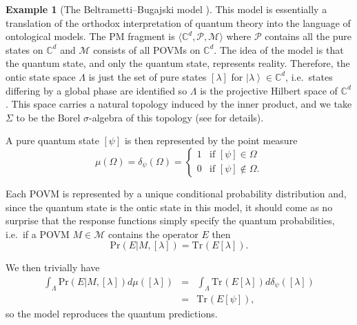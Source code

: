\documentclass[DIV=calc,paper=a4,fontsize=11pt,twocolumn]{scrartcl} %
\theoremstyle{definition}
\newtheorem{example}[definition]{Example}
\theoremstyle{plain}
\newcommand{\Ket}[1]{\ensuremath{\left \vert #1 \right \rangle}}
\newcommand{\Proj}[1]{\ensuremath{\left [ #1 \right ]}}
\newcommand{\Tr}[2][]{\ensuremath{\text{Tr}_{#1} \left ( #2 \right )}}
\begin{document}
\begin{example}[The Beltrametti--Bugajski model \cite{Beltrametti1995}]
This model is essentially a translation of the orthodox
interpretation of quantum theory into the language of ontological
models.  The PM fragment is $\langle \mathbb{C}^d, \mathcal{P},
\mathcal{M}\rangle$ where $\mathcal{P}$ contains all the pure states
on $\mathbb{C}^d$ and $\mathcal{M}$ consists of all POVMs on
$\mathbb{C}^d$.  The idea of the model is that the quantum state,
and only the quantum state, represents reality.  Therefore, the
ontic state space $\Lambda$ is just the set of pure states
$\Proj{\lambda}$ for $\Ket{\lambda} \in \mathbb{C}^d$, i.e.\ states
differing by a global phase are identified so $\Lambda$ is the
projective Hilbert space of $\mathbb{C}^d$.  This space carries a
natural topology induced by the inner product, and we take $\Sigma$
to be the Borel $\sigma$-algebra of this topology (see
\cite{Stulpe2007} for details).

A pure quantum state $\Proj{\psi}$ is then represented by the point
measure
\begin{equation}
\mu(\Omega) = \delta_{\psi}(\Omega) = \begin{cases} 1 &
\text{if}\,\, \Proj{\psi} \in \Omega \\
0 & \text{if}\,\, \Proj{\psi} \notin \Omega. \end{cases}
\end{equation}

Each POVM is represented by a unique conditional probability
distribution and, since the quantum state is the ontic state in this
model, it should come as no surprise that the response functions
simply specify the quantum probabilities, i.e.\ if a POVM $M \in
\mathcal{M}$ contains the operator $E$ then
\begin{equation}
\text{Pr}(E|M,\Proj{\lambda}) = \Tr{E \Proj{\lambda}}.
\end{equation}

We then trivially have
\begin{eqnarray}
\int_{\Lambda} \text{Pr}(E|M,\Proj{\lambda}) d\mu(\Proj{\lambda})  &=&
\int_{\Lambda} \Tr{E \Proj{\lambda}} d
\delta_{\psi}(\Proj{\lambda})\nonumber\\
&=& \Tr{E \Proj{\psi}},
\end{eqnarray}
so the model reproduces the quantum predictions.


\end{example}
\end{document}
